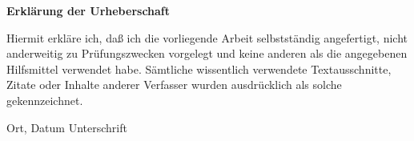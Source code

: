 \documentclass[a4paper]{article}
\begin{document}















\clearpage

%
%
%
\setcounter{biburllcpenalty}{7000}
\setcounter{biburlucpenalty}{8000}

\printbibliography[title=Literatur, keyword=literature]
\printbibliography[title=Software, keyword=software]
\printbibliography[title=Online, keyword=online]

\clearpage

\textbf{Erklärung der Urheberschaft}

\vspace{1cm}

Hiermit erkläre ich, daß ich die vorliegende Arbeit
selbstständig angefertigt, nicht anderweitig zu Prüfungszwecken vorgelegt und
keine anderen als die angegebenen Hilfsmittel verwendet habe. Sämtliche 
wissentlich verwendete Textausschnitte, Zitate oder Inhalte anderer Verfasser 
wurden ausdrücklich als solche gekennzeichnet.

\vfill

\hspace{2cm} Ort, Datum \hfill Unterschrift \hspace{2cm}
\end{document}
